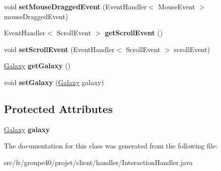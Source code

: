 \begin{DoxyCompactItemize}
void {\bfseries set\+Mouse\+Dragged\+Event} (Event\+Handler$<$ Mouse\+Event $>$ mouse\+Dragged\+Event)
\item 
\mbox{\label{classfr_1_1groupe40_1_1projet_1_1client_1_1handler_1_1_interaction_handler_a2ded2c50060e147f219c8d0d1a371018}} 
Event\+Handler$<$ Scroll\+Event $>$ {\bfseries get\+Scroll\+Event} ()
\item 
\mbox{\label{classfr_1_1groupe40_1_1projet_1_1client_1_1handler_1_1_interaction_handler_a2f82e0247f4e7282c58435f778fd90cc}} 
void {\bfseries set\+Scroll\+Event} (Event\+Handler$<$ Scroll\+Event $>$ scroll\+Event)
\item 
\mbox{\label{classfr_1_1groupe40_1_1projet_1_1client_1_1handler_1_1_interaction_handler_a1998207353f48dbf08bdbd58c301fb57}} 
\mbox{\hyperlink{classfr_1_1groupe40_1_1projet_1_1model_1_1board_1_1_galaxy}{Galaxy}} {\bfseries get\+Galaxy} ()
\item 
\mbox{\label{classfr_1_1groupe40_1_1projet_1_1client_1_1handler_1_1_interaction_handler_a0b8b96a543adcd6eba599d445891885d}} 
void {\bfseries set\+Galaxy} (\mbox{\hyperlink{classfr_1_1groupe40_1_1projet_1_1model_1_1board_1_1_galaxy}{Galaxy}} galaxy)
\end{DoxyCompactItemize}
\subsection*{Protected Attributes}
\begin{DoxyCompactItemize}
\item 
\mbox{\label{classfr_1_1groupe40_1_1projet_1_1client_1_1handler_1_1_interaction_handler_a39d69fa50a2af5e3403d5ba85e08d354}} 
\mbox{\hyperlink{classfr_1_1groupe40_1_1projet_1_1model_1_1board_1_1_galaxy}{Galaxy}} {\bfseries galaxy}
\end{DoxyCompactItemize}


The documentation for this class was generated from the following file\+:\begin{DoxyCompactItemize}
\item 
src/fr/groupe40/projet/client/handler/Interaction\+Handler.\+java\end{DoxyCompactItemize}

